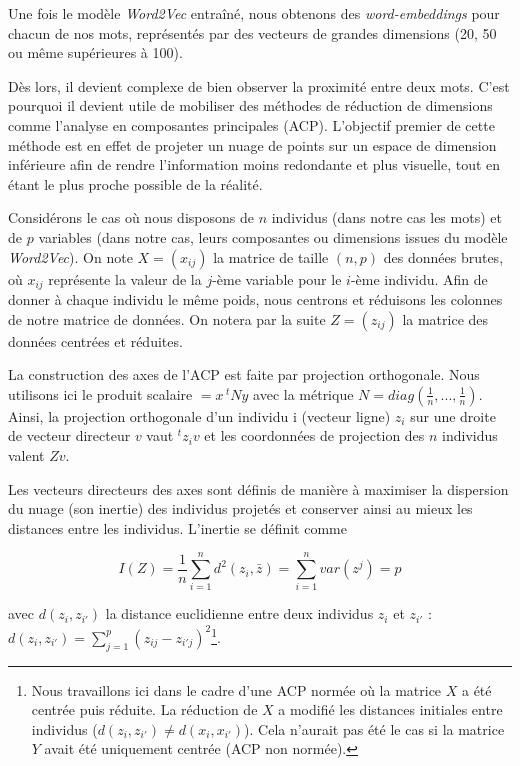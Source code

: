 \documentclass[11pt,french,french]{article}
\let\rmarkdownfootnote\footnote%
\def\footnote{\protect\rmarkdownfootnote}
\begin{document}
Une fois le modèle \emph{Word2Vec} entraîné, nous obtenons des
\emph{word-embeddings} pour chacun de nos mots, représentés par des
vecteurs de grandes dimensions (20, 50 ou même supérieures à 100).

Dès lors, il devient complexe de bien observer la proximité entre deux
mots. C'est pourquoi il devient utile de mobiliser des méthodes de
réduction de dimensions comme l'analyse en composantes principales
(ACP). L'objectif premier de cette méthode est en effet de projeter un
nuage de points sur un espace de dimension inférieure afin de rendre
l'information moins redondante et plus visuelle, tout en étant le plus
proche possible de la réalité.

Considérons le cas où nous disposons de \(n\) individus (dans notre cas
les mots) et de \(p\) variables (dans notre cas, leurs composantes ou
dimensions issues du modèle \emph{Word2Vec}). On note \(X = (x_{ij})\)
la matrice de taille \((n,p)\) des données brutes, où \(x_{ij}\)
représente la valeur de la \(j\)-ème variable pour le \(i\)-ème
individu. Afin de donner à chaque individu le même poids, nous centrons
et réduisons les colonnes de notre matrice de données. On notera par la
suite \(Z = (z_{ij})\) la matrice des données centrées et réduites.

La construction des axes de l'ACP est faite par projection orthogonale.
Nous utilisons ici le produit scalaire \(<x,y> = x\,^t N y\) avec la
métrique \(N = diag(\frac{1}{n},...,\frac{1}{n})\). Ainsi, la projection
orthogonale d'un individu i (vecteur ligne) \(z_i\) sur une droite de
vecteur directeur \(v\) vaut \(^tz_iv\) et les coordonnées de projection
des \(n\) individus valent \(Zv\).

Les vecteurs directeurs des axes sont définis de manière à maximiser la
dispersion du nuage (son inertie) des individus projetés et conserver
ainsi au mieux les distances entre les individus. L'inertie se définit
comme

\[I(Z) = \frac{1}{n} \sum \limits_{i = 1}^n d^2(z_i,\bar{z}) = \sum \limits_{i = 1}^n var(z^j) = p\]

avec \(d(z_i,z_{i'})\) la distance euclidienne entre deux individus
\(z_i\) et \(z_{i'}\) :
\(d(z_i,z_{i'}) = \sum \limits_{j=1}^p (z_{ij} - z_{i'j})^2\)\footnote{Nous
  travaillons ici dans le cadre d'une ACP normée où la matrice \(X\) a
  été centrée puis réduite. La réduction de \(X\) a modifié les
  distances initiales entre individus
  (\(d(z_i,z_{i'}) \neq d(x_i,x_{i'})\)). Cela n'aurait pas été le cas
  si la matrice \(Y\) avait été uniquement centrée (ACP non normée).}.
\end{document}
